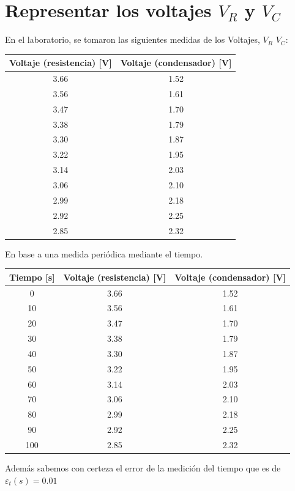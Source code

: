 \documentclass{article}
\begin{document}
\maketitle
\tableofcontents
\newpage


\section{Representar los voltajes $V_R$ y $V_C$}
En el laboratorio, se tomaron las siguientes medidas de los Voltajes, $V_R$ $V_C$:
\begin{table}[H]
	\centering
	\begin{tabular}{|c|c|}
		\hline
		\textbf{Voltaje (resistencia) [V]} & \textbf{Voltaje (condensador) [V]} \\
		\hline
		3.66 & 1.52 \\
		3.56 & 1.61 \\
		3.47 & 1.70 \\
		3.38 & 1.79 \\
		3.30 & 1.87 \\
		3.22 & 1.95 \\
		3.14 & 2.03 \\
		3.06 & 2.10 \\
		2.99 & 2.18 \\
		2.92 & 2.25 \\
		2.85 & 2.32 \\
		\hline
	\end{tabular}
\end{table}
En base a una medida periódica mediante el tiempo.
\begin{table}[H]
	\centering
	\begin{tabular}{|c|c|c|}
		\hline
		\textbf{Tiempo [s]} & \textbf{Voltaje (resistencia) [V]} & \textbf{Voltaje (condensador) [V]} \\
		\hline
		0   & 3.66 & 1.52 \\
		10  & 3.56 & 1.61 \\
		20  & 3.47 & 1.70 \\
		30  & 3.38 & 1.79 \\
		40  & 3.30 & 1.87 \\
		50  & 3.22 & 1.95 \\
		60  & 3.14 & 2.03 \\
		70  & 3.06 & 2.10 \\
		80  & 2.99 & 2.18 \\
		90  & 2.92 & 2.25 \\
		100 & 2.85 & 2.32 \\
		\hline
	\end{tabular}
\end{table}
Además sabemos con certeza el error de la medición del tiempo que es de \(\varepsilon_t(s) = 0.01\)\vspace{2em}
\end{document}
